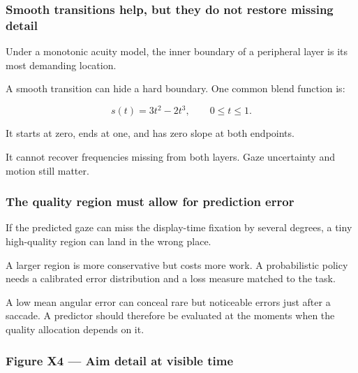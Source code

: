 \subsubsection{Smooth transitions help, but they do not restore missing detail}\label{04-visual-computing-ii-ch043-smooth-transitions-help-but-they-do-not-restore-missing-detail}

\hypertarget{04-visual-computing-ii-ch043-smooth-transitions-help-but-they-do-not-restore-missing-detail}{}

Under a monotonic acuity model, the inner boundary of a peripheral layer is its most demanding location.

A smooth transition can hide a hard boundary. One common blend function is:

\[
s(t)=3t^2-2t^3,\qquad 0\leq t\leq1.
\]

It starts at zero, ends at one, and has zero slope at both endpoints.

It cannot recover frequencies missing from both layers. Gaze uncertainty and motion still matter.

\subsubsection{The quality region must allow for prediction error}\label{04-visual-computing-ii-ch043-the-quality-region-must-allow-for-prediction-error}

\hypertarget{04-visual-computing-ii-ch043-the-quality-region-must-allow-for-prediction-error}{}

If the predicted gaze can miss the display-time fixation by several degrees, a tiny high-quality region can land in the wrong place.

A larger region is more conservative but costs more work. A probabilistic policy needs a calibrated error distribution and a loss measure matched to the task.

A low mean angular error can conceal rare but noticeable errors just after a saccade. A predictor should therefore be evaluated at the moments when the quality allocation depends on it.

\subsubsection{Figure X4 --- Aim detail at visible time}\label{04-visual-computing-ii-ch043-figure-x4-aim-detail-at-visible-time}

\hypertarget{04-visual-computing-ii-ch043-figure-x4-aim-detail-at-visible-time}{}

